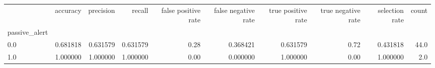 \begin{tabular}{lrrrrrrrrr}
\toprule
{} &  accuracy &  precision &    recall &  false positive rate &  false negative rate &  true positive rate &  true negative rate &  selection rate &  count \\
passive\_alert &           &            &           &                      &                      &                     &                     &                 &        \\
\midrule
0.0           &  0.681818 &   0.631579 &  0.631579 &                 0.28 &             0.368421 &            0.631579 &                0.72 &        0.431818 &   44.0 \\
1.0           &  1.000000 &   1.000000 &  1.000000 &                 0.00 &             0.000000 &            1.000000 &                0.00 &        1.000000 &    2.0 \\
\bottomrule
\end{tabular}

